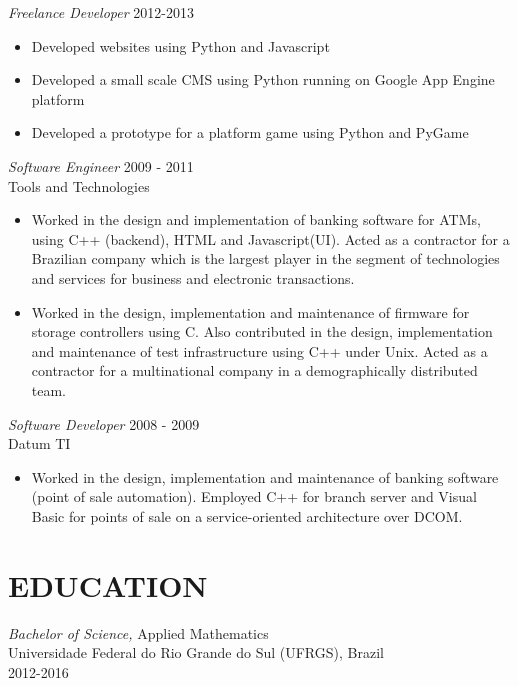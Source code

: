 \documentclass[line,margin]{res}
\begin{document}
\begin{resume}
\begin{itemize}
		\end{itemize} 
                {\sl Freelance Developer} \hfill 2012-2013
                 \begin{itemize}  \itemsep -2pt %
                 \item Developed websites using Python and Javascript
                \item Developed a small scale CMS using Python running on Google App Engine platform
                \item Developed a prototype for a platform game using Python and PyGame
                \end{itemize}
 
                {\sl Software Engineer} \hfill            2009 - 2011\\
                Tools and Technologies 
                 \begin{itemize}  \itemsep -2pt %
                 \item Worked in the design and implementation of banking software for ATMs, using C++ (backend),
                       HTML and Javascript(UI). Acted as a contractor for a Brazilian company which is the largest player
                       in the segment of technologies and services for business and electronic transactions.
                 \item Worked in the design, implementation and maintenance of firmware for storage controllers using C. 
                       Also contributed in the design, implementation and maintenance of test infrastructure 
                       using C++ under Unix. Acted as a contractor for a multinational company in a demographically distributed team.
                 \end{itemize} 

                {\sl Software Developer} \hfill        2008 - 2009\\
                Datum TI
                  \begin{itemize}
			  \item Worked in the design, implementation and maintenance of banking software (point of sale automation). 
				  Employed C++ for branch server and Visual Basic for points of sale on a service-oriented architecture over DCOM. 
                   \end{itemize} 

\section{EDUCATION} {\sl Bachelor of Science,} Applied Mathematics \\
                Universidade Federal do Rio Grande do Sul (UFRGS), Brazil \\ 
                2012-2016


\end{resume}
\end{document}
